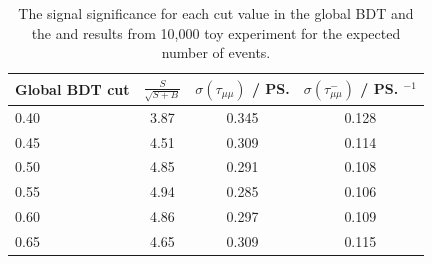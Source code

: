 {\begin{table}[htbp]
\begin{center}
\begin{tabular}{lccc}
\hline
Global BDT cut & $\frac{S}{\sqrt{S+B}}$&  $\sigma \left(\tau_{\mu\mu} \right)$   / \ps & $\sigma \left(\tau^{-}_{\mu\mu} \right)$ / \ps$^{-1}$ \\   
\hline
0.40           & 3.87 & 0.345 & 0.128 \\ %
0.45        & 4.51 & 0.309 & 0.114 \\ %
0.50        & 4.85 & 0.291 & 0.108 \\ %
0.55       & 4.94 & 0.285 & 0.106 \\ %
0.60           & 4.86 & 0.297 & 0.109 \\ %
0.65            & 4.65 & 0.309 & 0.115 \\  \hline%
\end{tabular} 
\vspace{0.7cm}
\caption{ The signal significance for each cut value in the global BDT and the \tmumu and \invtmumu results from 10,000 toy experiment for the expected number of events. }
\label{tab:selOptimisation}
\end{center}
\vspace{-1.0cm}
\end{table}

}
